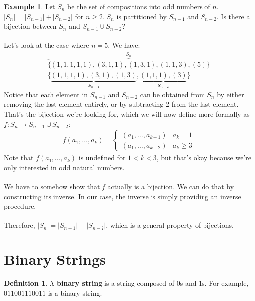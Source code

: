 \documentclass[]{article}
\theoremstyle{definition}
\newtheorem*{defn}{Definition}
\newtheorem{ex}{Example}[section]
\newcommand{\lecture}[1]{\marginpar{{\footnotesize $\leftarrow$ \underline{#1}}}}
\begin{document}
				\begin{ex}
					Let $S_n$ be the set of compositions into odd numbers of $n$. $|S_n| = |S_{n - 1}| + |S_{n - 2}|$ for $n \ge 2$. $S_n$ is partitioned by $S_{n - 1}$ and $S_{n - 2}$. Is there a bijection between $S_n$ and $S_{n - 1} \cup S_{n - 2}$?
					\\ \\
					Let's look at the case where $n = 5$. We have: \lecture{January 25, 2013}
					\begin{align*}
						\overbrace{\{ (1, 1, 1, 1, 1), (3, 1, 1), (1, 3, 1), (1, 1, 3), (5) \}}^{S_n} \\
						\{ \underbrace{(1, 1, 1, 1), (3, 1), (1, 3)}_{S_{n - 1}}, \underbrace{(1, 1, 1), (3)}_{S_{n - 2}} \} 
					\end{align*}
					Notice that each element in $S_{n - 1}$ and $S_{n - 2}$ can be obtained from $S_n$ by either removing the last element entirely, or by subtracting 2 from the last element. That's the bijection we're looking for, which we will now define more formally as $f : S_n \to S_{n - 1} \cup S_{n - 2}$:
					\begin{align*}
						f(a_1, \ldots, a_k) = \begin{cases}
							(a_1, \ldots, a_{k - 1}) & a_k = 1 \\
							(a_1, \ldots, a_{k - 2}) & a_k \ge 3
						\end{cases}
					\end{align*}
					Note that $f(a_1, \ldots, a_k)$ is undefined for $1 < k < 3$, but that's okay because we're only interested in odd natural numbers. 
					\\ \\
					We have to somehow show that $f$ actually is a bijection. We can do that by constructing its inverse. In our case, the inverse is simply providing an inverse procedure.
					\\ \\
					Therefore, $|S_n| = |S_{n - 1}| + |S_{n - 2}|$, which is a general property of bijections.
				\end{ex}
	
	\section{Binary Strings}
		\begin{defn}
		A \textbf{binary string} is a string composed of 0s and 1s. For example, $011001110011$ is a binary string.
		\end{defn}
\end{document}
